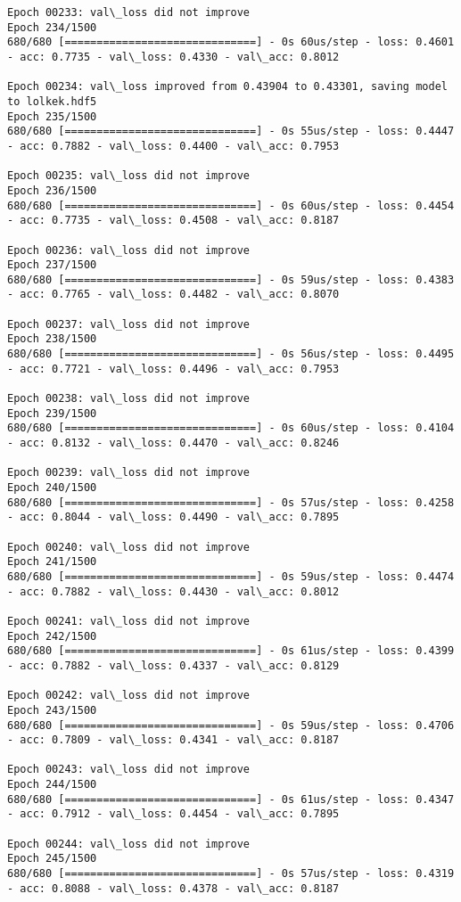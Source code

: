 \documentclass[11pt]{article}
\begin{document}
\begin{Verbatim}[commandchars=\\\{\}]
Epoch 00233: val\_loss did not improve
Epoch 234/1500
680/680 [==============================] - 0s 60us/step - loss: 0.4601 - acc: 0.7735 - val\_loss: 0.4330 - val\_acc: 0.8012

Epoch 00234: val\_loss improved from 0.43904 to 0.43301, saving model to lolkek.hdf5
Epoch 235/1500
680/680 [==============================] - 0s 55us/step - loss: 0.4447 - acc: 0.7882 - val\_loss: 0.4400 - val\_acc: 0.7953

Epoch 00235: val\_loss did not improve
Epoch 236/1500
680/680 [==============================] - 0s 60us/step - loss: 0.4454 - acc: 0.7735 - val\_loss: 0.4508 - val\_acc: 0.8187

Epoch 00236: val\_loss did not improve
Epoch 237/1500
680/680 [==============================] - 0s 59us/step - loss: 0.4383 - acc: 0.7765 - val\_loss: 0.4482 - val\_acc: 0.8070

Epoch 00237: val\_loss did not improve
Epoch 238/1500
680/680 [==============================] - 0s 56us/step - loss: 0.4495 - acc: 0.7721 - val\_loss: 0.4496 - val\_acc: 0.7953

Epoch 00238: val\_loss did not improve
Epoch 239/1500
680/680 [==============================] - 0s 60us/step - loss: 0.4104 - acc: 0.8132 - val\_loss: 0.4470 - val\_acc: 0.8246

Epoch 00239: val\_loss did not improve
Epoch 240/1500
680/680 [==============================] - 0s 57us/step - loss: 0.4258 - acc: 0.8044 - val\_loss: 0.4490 - val\_acc: 0.7895

Epoch 00240: val\_loss did not improve
Epoch 241/1500
680/680 [==============================] - 0s 59us/step - loss: 0.4474 - acc: 0.7882 - val\_loss: 0.4430 - val\_acc: 0.8012

Epoch 00241: val\_loss did not improve
Epoch 242/1500
680/680 [==============================] - 0s 61us/step - loss: 0.4399 - acc: 0.7882 - val\_loss: 0.4337 - val\_acc: 0.8129

Epoch 00242: val\_loss did not improve
Epoch 243/1500
680/680 [==============================] - 0s 59us/step - loss: 0.4706 - acc: 0.7809 - val\_loss: 0.4341 - val\_acc: 0.8187

Epoch 00243: val\_loss did not improve
Epoch 244/1500
680/680 [==============================] - 0s 61us/step - loss: 0.4347 - acc: 0.7912 - val\_loss: 0.4454 - val\_acc: 0.7895

Epoch 00244: val\_loss did not improve
Epoch 245/1500
680/680 [==============================] - 0s 57us/step - loss: 0.4319 - acc: 0.8088 - val\_loss: 0.4378 - val\_acc: 0.8187


\end{Verbatim}
\end{document}
